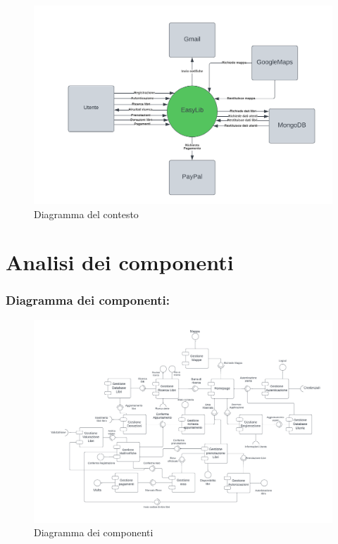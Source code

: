 \documentclass{article}
\begin{document}
\begin{figure}[H]
    \centering
    \includegraphics[width=130mm]{D2/Images/Diagramma contesto.png}
    \caption{Diagramma del contesto}
\end{figure}

\section{Analisi dei componenti}
\subsubsection{Diagramma dei componenti:}

\begin{figure}[H]
    \centering
    \includegraphics[width=130mm]{D2/Images/Diagramma_componenti_2.png}
    \caption{Diagramma dei componenti}
\end{figure}
\end{document}
